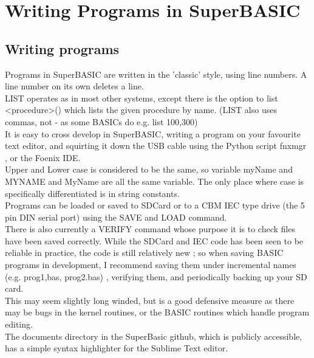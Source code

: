 \chapter{Writing Programs in SuperBASIC}

\section {Writing programs}
Programs in SuperBASIC are written in the 'classic' style, using line numbers. A line number on its own deletes a line.\\

LIST operates as in most other systems, except there is the option to list <procedure>() which lists the given procedure by name. (LIST also uses commas, not - as some BASICs do e.g. list 100,300)\\

It is easy to cross develop in SuperBASIC, writing a program on your favourite text editor, and squirting it down the USB cable using the Python script fnxmgr , or the Foenix IDE.\\

Upper and Lower case is considered to be the same, so variable myName and MYNAME and MyName are all the same variable. The only place where case is specifically differentiated is in string constants.\\

Programs can be loaded or saved to SDCard or to a CBM IEC type drive (the 5 pin DIN serial port) using the SAVE and LOAD command.\\

There is also currently a VERIFY command whose purpose it is to check files have been saved correctly. While the SDCard and IEC code has been seen to be reliable in practice, the code is still relatively new ; so when saving BASIC programs in development, I recommend saving them under incremental names (e.g. prog1,bas, prog2.bas) , verifying them, and periodically backing up your SD card.\\

This may seem slightly long winded, but is a good defensive measure as there may be bugs in the kernel routines, or the BASIC routines which handle program editing. \\

The documents directory in the SuperBasic github, which is publicly accessible, has a simple syntax highlighter for the Sublime Text editor.